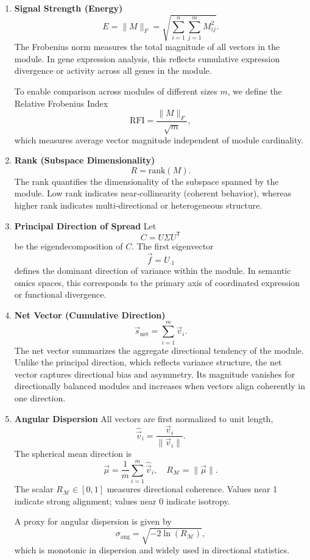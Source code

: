 \documentclass{article}
\begin{document}
\begin{enumerate}

\item \textbf{Signal Strength (Energy)}  
\[
E = \|M\|_{F}
= \sqrt{\sum_{i=1}^{n}\sum_{j=1}^{m} M_{ij}^{2}}.
\]
The Frobenius norm measures the total magnitude of all vectors in the module.
In gene expression analysis, this reflects cumulative expression divergence or
activity across all genes in the module.

To enable comparison across modules of different sizes \(m\), we define the
Relative Frobenius Index
\[
\mathrm{RFI} = \frac{\|M\|_F}{\sqrt{m}},
\]
which measures average vector magnitude independent of module cardinality.

\item \textbf{Rank (Subspace Dimensionality)}  
\[
R = \mathrm{rank}(M).
\]
The rank quantifies the dimensionality of the subspace spanned by the module.
Low rank indicates near-collinearity (coherent behavior), whereas higher rank
indicates multi-directional or heterogeneous structure.

\item \textbf{Principal Direction of Spread}  
Let
\[
C = U \Sigma U^{\mathsf{T}}
\]
be the eigendecomposition of \(C\).
The first eigenvector
\[
\vec{f} = U_{\cdot 1}
\]
defines the dominant direction of variance within the module.
In semantic omics spaces, this corresponds to the primary axis of coordinated
expression or functional divergence.

\item \textbf{Net Vector (Cumulative Direction)}  
\[
\vec{s}_{\mathrm{net}} = \sum_{i=1}^{m} \vec{v}_i.
\]
The net vector summarizes the aggregate directional tendency of the module.
Unlike the principal direction, which reflects variance structure, the net
vector captures directional bias and asymmetry.
Its magnitude vanishes for directionally balanced modules and increases when
vectors align coherently in one direction.

\item \textbf{Angular Dispersion}  
All vectors are first normalized to unit length,
\[
\hat{\vec{v}}_i = \frac{\vec{v}_i}{\|\vec{v}_i\|}.
\]
The spherical mean direction is
\[
\vec{\mu} =
\frac{1}{m} \sum_{i=1}^{m} \hat{\vec{v}}_i,
\quad
R_{\mathcal{M}} = \|\vec{\mu}\|.
\]
The scalar \(R_{\mathcal{M}} \in [0,1]\) measures directional coherence.
Values near 1 indicate strong alignment; values near 0 indicate isotropy.

A proxy for angular dispersion is given by
\[
\sigma_{\mathrm{ang}} = \sqrt{-2 \ln(R_{\mathcal{M}})},
\]
which is monotonic in dispersion and widely used in directional statistics.


\end{enumerate}
\end{document}
